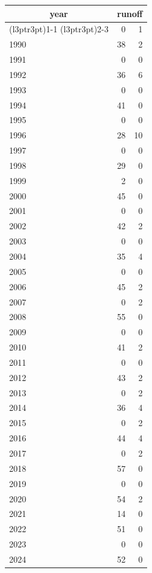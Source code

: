 \footnotesize\begin{tabular}[t]{lrr}
\toprule
\multicolumn{1}{c}{year} & \multicolumn{2}{c}{runoff} \\
\cmidrule(l{3pt}r{3pt}){1-1} \cmidrule(l{3pt}r{3pt}){2-3}
  & 0 & 1\\
\midrule
1990 & 38 & 2\\
1991 & 0 & 0\\
1992 & 36 & 6\\
1993 & 0 & 0\\
1994 & 41 & 0\\
1995 & 0 & 0\\
1996 & 28 & 10\\
1997 & 0 & 0\\
1998 & 29 & 0\\
1999 & 2 & 0\\
2000 & 45 & 0\\
2001 & 0 & 0\\
2002 & 42 & 2\\
2003 & 0 & 0\\
2004 & 35 & 4\\
2005 & 0 & 0\\
2006 & 45 & 2\\
2007 & 0 & 2\\
2008 & 55 & 0\\
2009 & 0 & 0\\
2010 & 41 & 2\\
2011 & 0 & 0\\
2012 & 43 & 2\\
2013 & 0 & 2\\
2014 & 36 & 4\\
2015 & 0 & 2\\
2016 & 44 & 4\\
2017 & 0 & 2\\
2018 & 57 & 0\\
2019 & 0 & 0\\
2020 & 54 & 2\\
2021 & 14 & 0\\
2022 & 51 & 0\\
2023 & 0 & 0\\
2024 & 52 & 0\\
\bottomrule
\end{tabular}
